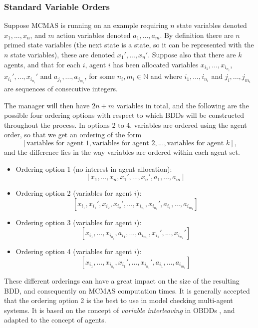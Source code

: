 \documentclass[11pt]{article}
\begin{document}
\subsubsection{Standard Variable Orders}
 \label{std_orderings}
Suppose MCMAS is running on an example requiring $n$ state variables denoted $x_1, ..., x_n$, and $m$ action variables denoted $a_1, ..., a_m$. By definition there are $n$ primed state variables (the next state is a state, so it can be represented with the $n$ state variables), these are denoted $x_1', ..., x_n'$. 
Suppose also that there are $k$ agents, and that for each $i$, agent $i$ has been allocated variables $x_{i_1}, ..., x_{i_{n_i}}$, $x_{i_1}', ..., x_{i_{n_i}}'$ and $a_{j_1}, ..., a_{j_{m_i}}$, for some $n_i, m_i \in \mathbb{N}$ and where $i_1, ..., i_{n_i}$ and $j_i, ..., j_{m_i}$ are sequences of consecutive integers.



The manager will then have $2n + m$ variables in total, and the following are the possible four ordering options with respect to which BDDs will be constructed throughout the process.
In options 2 to 4, variables are ordered using the agent order, so that we get an ordering of the form $$ [\mbox{variables for agent } 1, \mbox{variables for agent } 2, ...,  \mbox{variables for agent } k],$$ 
and the difference lies in the way variables are ordered within each agent set.
\begin{itemize}
\item Ordering option 1 (no interest in agent allocation):
$$[x_1, ..., x_n, x_1', ..., x_n', a_1, ..., a_m]$$
\item Ordering option 2 (variables for agent $i$):
$$
 [x_{i_1}, x_{i_1}', x_{i_2}, x_{i_2}',..., x_{i_{n_i}}, x_{i_{n_1}}', a_{i_1}, ..., a_{i_{m_1}}]
$$
\item Ordering option 3 (variables for agent $i$):
$$
 [x_{i_1}, ..., x_{i_{n_i}},a_{i_1}, ..., a_{i_{m_1}}, x_{i_1}', ..., x_{i_{n_1}}']
$$
\item Ordering option 4 (variables for agent $i$):
$$
 [x_{i_1}, ..., x_{i_{n_i}}, x_{i_1}', ..., x_{i_{n_1}}', a_{i_1}, ..., a_{i_{m_1}}]
$$
\end{itemize}

These different orderings can have a great impact on the size of the resulting BDD, and consequently on MCMAS computation times. It is generally accepted that the ordering option 2 is the best to use in model checking multi-agent systems. It is based on the concept of \textit{variable interleaving} in OBDDs \cite{interleaving}, and adapted to the concept of agents.
\end{document}
